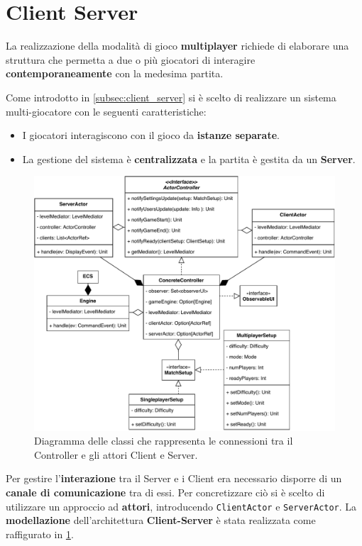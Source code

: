 \section{Client Server}
\label{sec:client_server_design}
La realizzazione della modalità di gioco \textbf{multiplayer} richiede di elaborare una struttura che permetta a due o più giocatori di interagire \textbf{contemporaneamente} con la medesima partita.

Come introdotto in \ref{subsec:client_server} si è scelto di realizzare un sistema multi-giocatore con le seguenti caratteristiche:
\begin{itemize}
    \item I giocatori interagiscono con il gioco da \textbf{istanze separate}.
    \item La gestione del sistema è \textbf{centralizzata} e la partita è gestita da un \textbf{Server}.
\end{itemize}

\begin{figure}[H]
	\centering
	\includegraphics[width=0.99\columnwidth]{drawio/client-server/Controller-Actors-Interaction.pdf}
	\caption{Diagramma delle classi che rappresenta le connessioni tra il Controller e gli attori Client e Server.}
	\label{fig:Controller-Actors-Interaction}
\end{figure}

Per gestire l'\textbf{interazione} tra il Server e i Client era necessario disporre di un \textbf{canale di comunicazione} tra di essi. Per concretizzare ciò si è scelto di utilizzare un approccio ad \textbf{attori}, introducendo \texttt{ClientActor} e \texttt{ServerActor}.
La \textbf{modellazione} dell'architettura \textbf{Client-Server} è stata realizzata come raffigurato in \ref{fig:Controller-Actors-Interaction}.

